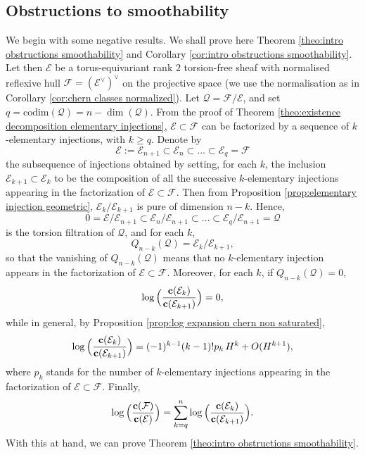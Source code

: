 \documentclass[a4paper,10pt]{amsart}
\theoremstyle{plain}{
    \newtheorem{theorem}{Theorem}[section]
    \newtheorem{lemma}[theorem]{Lemma}
    \newtheorem{corollary}[theorem]{Corollary}
    \newtheorem{proposition}[theorem]{Proposition}
    \newtheorem{conjecture}[theorem]{Conjecture}
}
\theoremstyle{definition}{
    \newtheorem{definition}[theorem]{Definition}
    \newtheorem{defn-thm}[theorem]{Definition-Theorem}
    \newtheorem{example}[theorem]{Example}
    \newtheorem{notation}[theorem]{Notation}
}
\theoremstyle{remark}{
    \newtheorem{remark}[theorem]{Remark}
    \newtheorem{problem}[theorem]{Problem}
    \newtheorem{question}[theorem]{Question}
}
\def\uc{{\bf c}}
\def\cF{\mathcal{F}}
\def\cE{\mathcal{E}}
\def\cQ{\mathcal{Q}}
\def\codim{\mathrm{codim}}
\begin{document}
\subsection{Obstructions to smoothability}
\label{sec:negative results}
We begin with some negative results. We shall prove here Theorem \ref{theo:intro obstructions smoothability} and Corollary \ref{cor:intro obstructions smoothability}. Let then $\cE$ be a  torus-equivariant rank $2$ torsion-free sheaf with normalised reflexive hull $\cF=(\cE^\vee)^\vee$ on the projective space (we use the normalisation as in Corollary \ref{cor:chern classes normalized}). Let $\cQ=\cF/\cE$, and set $q=\codim(\cQ)=n-\dim(\cQ)$. From the proof of Theorem \ref{theo:existence decomposition elementary injections}, $\cE\subset\cF$ can be factorized by a sequence of $k$-elementary injections, with $k\geq q$. Denote by 
$$
\cE:=\cE_{n+1}\subset\cE_n\subset  \ldots\subset \cE_q=\cF
$$
the subsequence of injections obtained by setting, for each $k$, the inclusion $\cE_{k+1}\subset  \cE_k$ to be the composition of all the successive $k$-elementary injections appearing in the factorization of $\cE\subset\cF$. Then from Proposition \ref{prop:elementary injection geometric}, $\cE_k/\cE_{k+1}$ is pure of dimension $n-k$.
Hence,
$$
0=\cE/\cE_{n+1}\subset \cE_n/\cE_{n+1}\subset\ldots\subset \cE_q/\cE_{n+1}=\cQ
$$
is the torsion filtration of $\cQ$, and for each $k$,
$$
Q_{n-k}(\cQ)=\cE_k/\cE_{k+1},
$$
so that the vanishing of $Q_{n-k}(\cQ)$ means that no $k$-elementary injection appears in the factorization of $\cE\subset\cF$. Moreover, for each $k$, if $Q_{n-k}(\cQ)=0$, 
\begin{equation}
 \label{eq:log E_k E_k+1 vanish}
\log\Big(\frac{\uc(\cE_k)}{\uc(\cE_{k+1})} \Big)=0,
\end{equation}
while in general, by Proposition \ref{prop:log expansion chern non saturated}, 
\begin{equation}
 \label{eq:log E_k E_k+1}
\log\Big(\frac{\uc(\cE_k)}{\uc(\cE_{k+1})} \Big)=(-1)^{k-1}(k-1)!p_k\, H^k+O(H^{k+1}),
\end{equation}
where $p_k$ stands for the number of $k$-elementary injections appearing in the factorization of $\cE\subset\cF$. Finally,
\begin{equation}
 \label{eq:log F E obstruction result}
\log\Big(\frac{\uc(\cF)}{\uc(\cE)} \Big)=\sum_{k=q}^n\log\Big(\frac{\uc(\cE_{k})}{\uc(\cE_{k+1})} \Big).
\end{equation}
With this at hand, we can prove Theorem \ref{theo:intro obstructions smoothability}.
\end{document}
